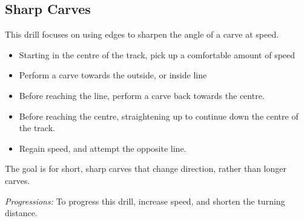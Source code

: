 \subsection*{Sharp Carves}
\label{drill:carves/sharp}

This drill focuses on using edges to sharpen the angle of a carve at speed.

\begin{itemize}
    \item Starting in the centre of the track, pick up a comfortable amount of speed 
    \item Perform a carve towards the outside, or inside line 
    \item Before reaching the line, perform a carve back towards the centre. 
    \item Before reaching the centre, straightening up to continue down the centre of the track. 
    \item Regain speed, and attempt the opposite line. 
\end{itemize}

The goal is for short, sharp carves that change direction, rather than longer carves. 

{\it Progressions:}
To progress this drill, increase speed, and shorten the turning distance.

